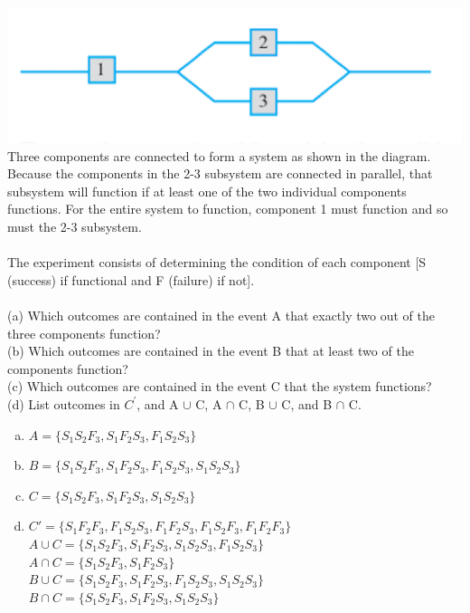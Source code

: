 \documentclass[12pt,letterpaper]{hmcpset}
\begin{document}

\begin{problem}[2.1.3]
\includegraphics[scale=1]{Nov_3_1.png}\\
    Three components are connected to form a system as shown in the diagram. Because the components in the 2-3 subsystem are connected in parallel, that subsystem will function if at least one of the two individual components functions. For the entire system to function, component 1 must function and so must the 2-3 subsystem.\\ \\
    The experiment consists of determining the condition of each component [S (success) if functional and F (failure) if not].
\\ \\
(a) Which outcomes are contained in the event A that exactly two out of the three components function?
\\
(b) Which outcomes are contained in the event B that at least two of the components function?
\\
(c) Which outcomes are contained in the event C that the system functions?
\\
(d) List outcomes in $C^\prime$, and A $\cup$ C, A $\cap$ C, B $\cup$ C, and B $\cap$ C.

\end{problem}

\begin{solution}
	\begin{enumerate}[(a)]
		\item $A = \{S_1S_2F_3, S_1F_2S_3, F_1S_2S_3\}$
		\item $B = \{S_1S_2F_3, S_1F_2S_3, F_1S_2S_3, S_1S_2S_3\}$
		\item $C = \{S_1S_2F_3, S_1F_2S_3, S_1S_2S_3\}$
		\item $C' = \{S_1F_2F_3, F_1S_2S_3, F_1F_2S_3, F_1S_2F_3, F_1F_2F_3\}$ \\
		$A \cup C = \{S_1S_2F_3, S_1F_2S_3, S_1S_2S_3, F_1S_2S_3\}$ \\
		$A \cap C = \{S_1S_2F_3, S_1F_2S_3\}$ \\
		$B \cup C = \{S_1S_2F_3, S_1F_2S_3, F_1S_2S_3, S_1S_2S_3\}$ \\
		$B \cap C = \{S_1S_2F_3, S_1F_2S_3, S_1S_2S_3\}$
	\end{enumerate}
\end{solution}
\newpage
\end{document}
